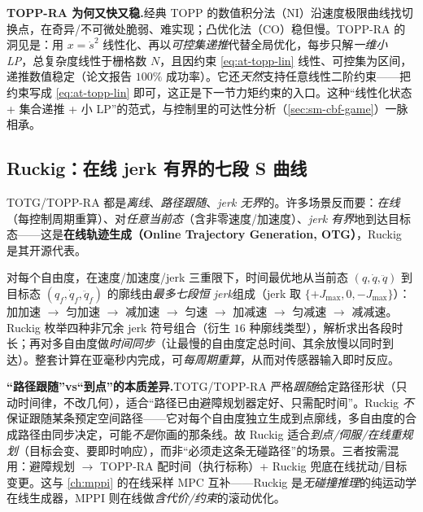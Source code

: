 \begin{insight}
\textbf{TOPP-RA 为何又快又稳.}\;经典 TOPP 的数值积分法（NI）沿速度极限曲线找切换点，在奇异/不可微处脆弱、难实现；凸优化法（CO）稳但慢。TOPP-RA 的洞见是：用 $x=\dot s^2$ 线性化、再以\emph{可控集递推}代替全局优化，每步只解\emph{一维小 LP}，总复杂度线性于栅格数 $N$，且因约束 \cref{eq:at-topp-lin} 线性、可控集为区间，递推数值稳定（论文报告 $100\%$ 成功率）。它还\emph{天然}支持任意线性二阶约束——把约束写成 \cref{eq:at-topp-lin} 即可，这正是下一节力矩约束的入口。这种“线性化状态 + 集合递推 + 小 LP”的范式，与控制里的可达性分析（\cref{sec:sm-cbf-game}）一脉相承。
\end{insight}

\subsection{Ruckig：在线 jerk 有界的七段 S 曲线}
\label{subsec:at-ruckig}

TOTG/TOPP-RA 都是\emph{离线}、\emph{路径跟随}、\emph{jerk 无界}的。许多场景反而要：\emph{在线}（每控制周期重算）、对\emph{任意当前态}（含非零速度/加速度）、\emph{jerk 有界}地到达目标态——这是\textbf{在线轨迹生成（Online Trajectory Generation, OTG）}，Ruckig 是其开源代表\cite{berscheid2021ruckig}。

\begin{algo}\label{alg:at-ruckig}
对每个自由度，在速度/加速度/jerk 三重限下，时间最优地从当前态 $(q,\dot q,\ddot q)$ 到目标态 $(q_f,\dot q_f,\ddot q_f)$ 的廓线由\emph{最多七段恒 jerk}组成（jerk 取 $\{+J_{\max},0,-J_{\max}\}$）：加加速 $\to$ 匀加速 $\to$ 减加速 $\to$ 匀速 $\to$ 加减速 $\to$ 匀减速 $\to$ 减减速。Ruckig 枚举四种非冗余 jerk 符号组合（衍生 $16$ 种廓线类型），解析求出各段时长；再对多自由度做\emph{时间同步}（让最慢的自由度定总时间、其余放慢以同时到达）。整套计算在亚毫秒内完成，可\emph{每周期重算}，从而对传感器输入即时反应。
\end{algo}

\begin{note}
\textbf{“路径跟随”vs“到点”的本质差异.}\;TOTG/TOPP-RA 严格\emph{跟随}给定路径形状（只动时间律，不改几何），适合“路径已由避障规划器定好、只需配时间”。Ruckig \emph{不}保证跟随某条预定空间路径——它对每个自由度独立生成到点廓线，多自由度的合成路径由同步决定，可能\emph{不是}你画的那条线。故 Ruckig 适合\emph{到点/伺服/在线重规划}（目标会变、要即时响应），而非“必须走这条无碰路径”的场景。三者按需混用：避障规划 $\to$ TOPP-RA 配时间（执行标称）+ Ruckig 兜底在线扰动/目标变更。这与 \cref{ch:mppi} 的在线采样 MPC 互补——Ruckig 是\emph{无碰撞推理}的纯运动学在线生成器，MPPI 则在线做\emph{含代价/约束}的滚动优化。
\end{note}

